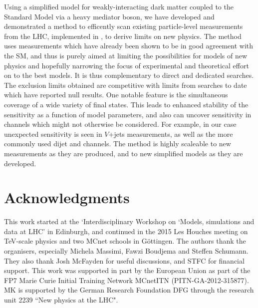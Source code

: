 \documentclass[floatfix]{article}
\begin{document}
Using a simplified model for weakly-interacting dark matter coupled to the Standard Model via a heavy mediator boson, we have developed and demonstrated 
a method to efficently scan existing particle-level measurements from the LHC, implemented in \rivet, to derive limits on new physics. 
The \Contur method uses measurements which have already been shown to be in good agreement with the SM, and thus is purely aimed at limiting the possibilities 
for models of new physics and hopefully narrowing the focus of experimental and theoretical effort on to the best models. It is thus complementary to 
direct and dedicated searches. The exclusion limits obtained are competitive with limits from searches to  date which have reported null results.
One notable feature is the simultaneous coverage of a wide variety of final states. This leads to enhanced stability of the sensitivity as a function of model
parameters, and also can uncover sensitivity in channels which might not otherwise be considered. For example, in our case unexpected sensitivity is seen in
$V$+jets measurements, as well as the more commonly used dijet and \MET channels. The method is highly scaleable to new measurements as they are produced, and
to new simplified models as they are developed.

\section*{Acknowledgments}
This work started at the `Interdisciplinary Workshop on ‘Models, simulations and data at LHC' in Edinburgh, and continued in the 2015 Les Houches meeting on 
TeV-scale physics and two MCnet schools in G\"ottingen. The authors thank the organisers, especially Michela Massimi, Fawzi Boudjema and Steffen Schumann. 
They also thank Josh McFayden for useful discussions, and STFC for financial support. This work was supported in part by the European Union as part of the FP7 Marie Curie Initial Training Network MCnetITN (PITN-GA-2012-315877). MK is supported by the German Research Foundation DFG through the research unit 2239 ``New physics at the LHC". 



\end{document}
